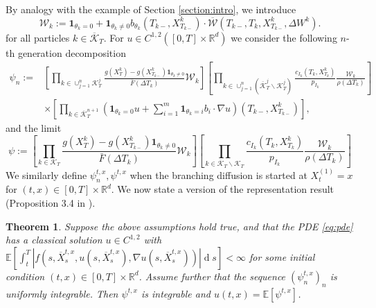 \documentclass[11pt]{article}
\newcommand{\R}{\mathbb{R}}
\newcommand{\diff}{\ensuremath{\operatorname{d}\!}}
\newtheorem{theorem}{Theorem}
\theoremstyle{definition}
\theoremstyle{remark}
\begin{document}
 By analogy with the example of Section \ref{section:intro}, we introduce
 \[
	 \mathcal W _{k} := \mathbf{1} _{\theta_k = 0} + \mathbf{1} _{\theta_k \neq 0} b _{\theta_k}(T _{k-},X ^{k}_{T _{k-}}) \cdot \overline{\mathcal W}(T _{k -}, T _{k}, X ^{k}_{T _{k-}}, \Delta W ^{k}).
 \]
 for all particles $k \in \overline{\mathcal K}_T$. For $u \in C ^{1,2}([0,T]\times \R ^{d})$ we consider the following $n$-th generation decomposition
 \begin{equation}
	 \label{eq:nth-decomposition}
\begin{aligned}
	\psi_n := & \left[ \prod _{k \in \cup_{j = 1}^{n} \mathcal K _{T}^{j} } \frac{g(X ^{k}_{T}) - g(X ^{k}_{T _{k-}})\mathbf{1} _{\theta_k \neq 0}}{\overline{F}(\Delta T_k)}\mathcal W _{k} \right]  \left[ \prod _{k \in \cup _{j = 1}^{n}(\overline{\mathcal K}^{j}_{T} \backslash \mathcal K ^{j}_{T})} \frac{c _{I_k}(T _{k}, X ^{k}_{T _{k}})}{p _{I_k}} \frac{\mathcal W _{k}}{\rho(\Delta T _{k})} \right] \\
		  & \times \left[ \prod _{k \in \overline{\mathcal K}^{n+1}_{T}} \left(\mathbf{1} _{\theta _{k} = 0}u + \sum_{i = 1}^{m}\mathbf{1} _{\theta _{k} = i}b_i \cdot \nabla u\right)(T _{k-}, X ^{k}_{T _{k-}}) \right],
\end{aligned}
 \end{equation}
 and the limit 
 \begin{equation}
	 \label{eq:representation}
 \psi:=\left[\prod_{k \in \mathcal{K}_T} \frac{g(X_T^k)-g(X_{T_{k-}}^k) \mathbf{1}_{\theta_k \neq 0}}{\bar{F}(\Delta T_k)} \mathcal{W}_k\right]\left[\prod_{k \in \overline{\mathcal{K}}_T \backslash \mathcal{K}_T} \frac{c_{I_k}(T_k, X_{T_k}^k)}{p_{I_k}} \frac{\mathcal{W}_k}{\rho(\Delta T_k)}\right]
 \end{equation}
 We similarly define $\psi ^{t,x}_{n},\psi ^{t,x}$ when the branching diffusion is started at $X ^{(1)}_t = x$ for $(t,x) \in [0,T]\times \R ^{d}$.
 We now state a version of the representation result (Proposition 3.4 in \cite{labordere2019branching}).
 \begin{theorem}
	 Suppose the above assumptions hold true, and that the PDE \eqref{eq:pde} has a classical solution $u \in C ^{1,2}$ with $\mathbb E \left[ \int_{t}^{T} |f(s,\overline{X}^{t,x}_{s}, u(s,\overline{X}^{t,x}_{s}), \nabla u (s, \overline{X}^{t,x}_{s}) )| \diff s \right] < \infty$ for some initial condition $(t,x) \in [0,T]\times \R ^{d}$. Assume further that the sequence $(\psi ^{t,x}_{n})_n$ is uniformly integrable. Then $\psi ^{t,x}$ is integrable and $u(t,x) = \mathbb E \left[ \psi ^{t,x} \right]$.
 \end{theorem}
\end{document}
